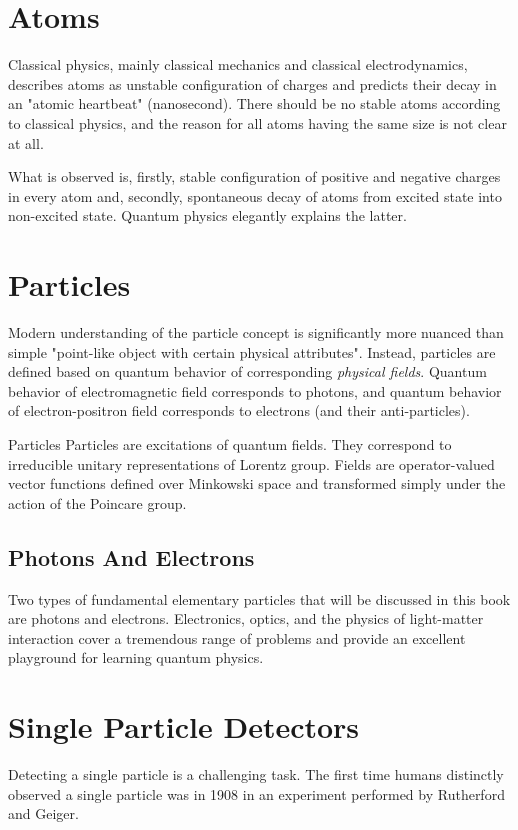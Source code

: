 \section{Atoms}
Classical physics, mainly classical mechanics and classical electrodynamics, describes atoms as unstable configuration of charges and predicts their decay in an "atomic heartbeat" (nanosecond). There should be no stable atoms according to classical physics, and the reason for all atoms having the same size is not clear at all.

What is observed is, firstly, stable configuration of positive and negative charges in every atom and, secondly,  spontaneous decay of atoms from excited state into non-excited state. Quantum physics elegantly explains the latter.  

\section{Particles}
Modern understanding of the particle concept is significantly more nuanced than simple "point-like object with certain physical attributes". Instead, particles are defined based on quantum behavior of corresponding \emph{physical fields}. Quantum behavior of electromagnetic field corresponds to photons, and quantum behavior of electron-positron field corresponds to electrons (and their anti-particles).

\begin{myrem}{Particles}
	Particles are excitations of quantum fields. They correspond to irreducible unitary representations of Lorentz group. Fields are operator-valued vector functions defined over Minkowski space and transformed simply under the action of the Poincare group.
\end{myrem}


\subsection{Photons And Electrons}
Two types of fundamental elementary particles that will be discussed in this book are photons and electrons. Electronics, optics, and the physics of light-matter interaction cover a tremendous range of problems and provide an excellent playground for learning quantum physics.


\section{Single Particle Detectors}
Detecting a single particle is a challenging task. The first time humans distinctly observed a single particle was in 1908 in an experiment performed by Rutherford and Geiger. 

